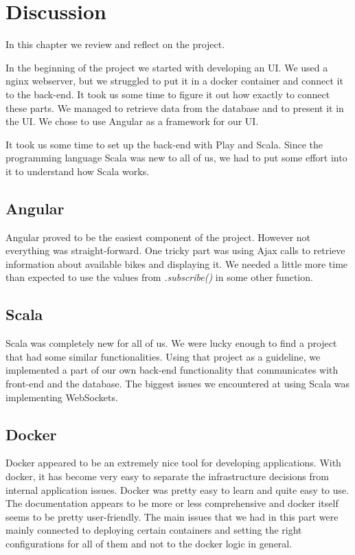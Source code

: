 \section{Discussion}

In this chapter we review and reflect on the project.

In the beginning of the project we started with developing an UI. We used a nginx webserver, but we struggled to put it in a docker container and connect it to the back-end. It took us some time to figure it out how exactly to connect these parts. We managed to retrieve data from the database and to present it in the UI. We chose to use Angular as a framework for our UI.

It took us some time to set up the back-end with Play and Scala. Since the programming language Scala was new to all of us, we had to put some effort into it to understand how Scala works.
\subsection{Angular}
Angular proved to be the easiest component of the project.  However not everything was straight-forward. One tricky part was using Ajax calls to retrieve information about available bikes and displaying it. We needed a little more time than expected to use the values from \textit{.subscribe()} in some other function.
\subsection{Scala}
Scala was completely new for all of us. We were lucky enough to find a project that had some similar functionalities. Using that project as a guideline, we implemented a part of our own back-end functionality that communicates with front-end and the database. The biggest issues we encountered at using Scala was implementing WebSockets.
\subsection{Docker}
Docker appeared to be an extremely nice tool for developing applications. With docker, it has become very easy to separate the infrastructure decisions from internal application issues. Docker was pretty easy to learn and quite easy to use. The documentation appears to be more or less comprehensive and docker itself seems to be pretty user-friendly. The main issues that we had in this part were mainly connected to deploying certain containers and setting the right configurations for all of them and not to the docker logic in general.

